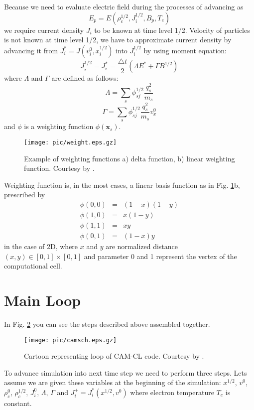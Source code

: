 \documentclass[oneside,branding,toc,article]{satdoc}
\begin{document}
Because we need to evaluate electric field during the processes of advancing as
\begin{equation}
  E_p = E (\rho_c^{1/2}, J_i^{1/2}, B_p, T_e)
\end{equation}
we require current density $J_i$ to be known at time level 1/2. Velocity of
particles is not known at time level 1/2, we have to approximate current
density by advancing it from $J_i^* = J (v_i^{0}, x_i^{1/2})$ into $J_i^{1/2}$
by using moment equation:
\begin{equation}
  \label{eq:curradv}
  J_i^{1/2} = J_i^* = \frac{\triangle t}{2} (\Lambda E^* + \Gamma B^{1/2})
\end{equation}
where $\Lambda$ and $\Gamma$ are defined as follows:
\begin{equation}
  \label{eq:lambda}
  \Lambda = \sum_s \phi_{sj}^{1/2} \frac{q_s^2}{m_s}
\end{equation}
\begin{equation}
  \label{eq:lambda}
  \Gamma = \sum_s \phi_{sj}^{1/2} \frac{q_s^2}{m_s} v_x^0
\end{equation}
and $\phi$ is a weighting function $\phi (\mathbf{x}_s)$.
\begin{figure}[!h]
  \centering
  \texttt{[image: pic/weight.eps.gz]}
  \caption{Example of weighting functions a) delta function, b) linear
    weighting function. Courtesy by \cite{bila85}.}
  \label{fig:weight}
\end{figure}
Weighting function is, in the most cases, a linear basis function as in
Fig. \ref{fig:weight}b, prescribed by
\begin{eqnarray}
  \label{eq:weight}
  \phi (0,0) & = & (1-x)(1-y) \nonumber \\
  \phi (1,0) & = & x(1-y)     \nonumber \\
  \phi (1,1) & = & xy         \nonumber \\
  \phi (0,1) & = & (1-x)y
  \end{eqnarray}
in the case of 2D, where $x$ and $y$ are normalized distance $(x,y) \in [0,1]
\times [0,1]$ and parameter 0 and 1 represent the vertex of the computational
cell.

\section{Main Loop}

In Fig. \ref{fig:loop} you can see the steps described above assembled
together.
\begin{figure}[!h]
  \centering
  \texttt{[image: pic/camsch.eps.gz]}
  \caption{Cartoon representing loop of CAM-CL code. Courtesy by
    \cite{matthews94}.}
  \label{fig:loop}
\end{figure}
To advance simulation into next time step we need to perform three steps.  Lets
assume we are given these variables at the beginning of the simulation:
$x^{1/2}$, $v^0$, $\rho_c^{0}$, $\rho_c^{1/2}$, $J_i^0$, $\Lambda$, $\Gamma$
and $J_i^+ = J_i^* (x^{1/2},v^0)$ where electron temperature $T_e$ is constant.
\end{document}
